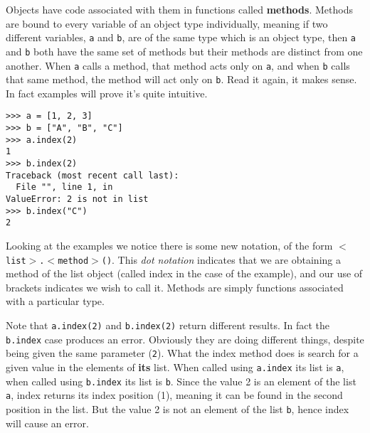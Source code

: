 Objects have code associated with them in functions called   \textbf{methods}. Methods are bound to every variable of an   object type individually, meaning if two different variables, \texttt{a} and   \texttt{b}, are of the same type which is an object type, then \texttt{a} and \texttt{b}   both have the same set of methods but their methods are distinct from   one another. When \texttt{a} calls a method, that method acts only on \texttt{a}, and   when \texttt{b} calls that same method, the method will act only on \texttt{b}. Read   it again, it makes sense. In fact examples will prove it's quite   intuitive.
\begin{lstlisting}
>>> a = [1, 2, 3]
>>> b = ["A", "B", "C"]
>>> a.index(2)
1
>>> b.index(2)
Traceback (most recent call last):
  File "", line 1, in 
ValueError: 2 is not in list
>>> b.index("C")
2
\end{lstlisting}

Looking at the examples we notice there is some new notation, of the   form 
\texttt{$<$list$>$.$<$method$>$()}. This \textit{dot notation}   indicates that we are obtaining a method of the list object (called   index in the case of the example), and our use of brackets indicates we   wish to call it.     Methods are simply functions associated with a particular type.    

Note that 
\texttt{a.index(2)} and 
\texttt{b.index(2)} return   different results. In fact the \texttt{b.index} case produces an error.   Obviously they are doing different things, despite being given the same   parameter (\texttt{2}). What the index method does is search for a given value   in the elements of \textbf{its} list. When called using   \texttt{a.index} its list is \texttt{a}, when called using \texttt{b.index} its list is \texttt{b}.   Since the value 2 is an element of the list \texttt{a}, index returns its   index position (1), meaning it can be found in the second position in   the list. But the value 2 is not an element of the list \texttt{b}, hence   index will cause an error.

